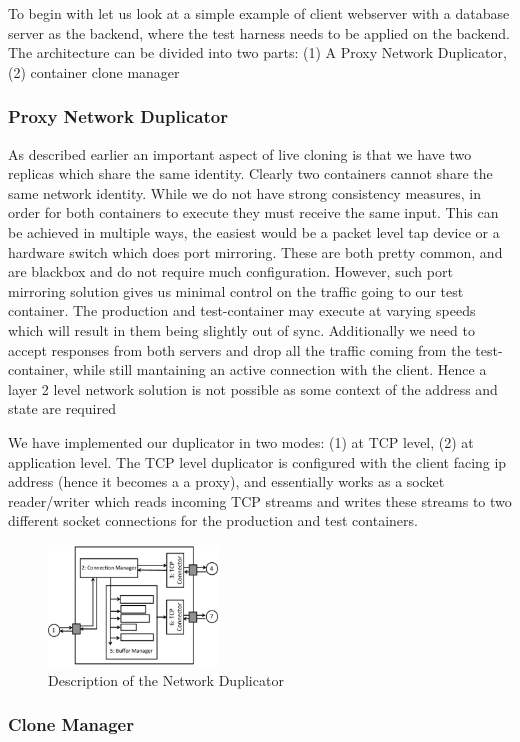 To begin with let us look at a simple example of client webserver with a database server as the backend, where the test harness needs to be applied on the backend.
The architecture can be divided into two parts: (1) A Proxy Network Duplicator, (2) container clone manager


\subsubsection{Proxy Network Duplicator} As described earlier an important aspect of live cloning is that we have two replicas which share the same identity.
Clearly two containers cannot share the same network identity. 
While we do not have strong consistency measures, in order for both containers to execute they must receive the same input.
This can be achieved in multiple ways, the easiest would be a packet level tap device or a hardware switch which does port mirroring. 
These are both pretty common, and are blackbox and do not require much configuration.
However, such port mirroring solution gives us minimal control on the traffic going to our test container.
The production and test-container may execute at varying speeds which will result in them being slightly out of sync.
Additionally we need to accept responses from both servers and drop all the traffic coming from the test-container, while still mantaining an active connection with the client.
Hence a layer 2 level network solution is not possible as some context of the address and state are required

We have implemented our duplicator in two modes: (1) at TCP level, (2) at application level.
The TCP level duplicator is configured with the client facing ip address (hence it becomes  a a proxy), and essentially works as a socket reader/writer which reads incoming TCP streams and writes these streams to two different socket connections for the production and test containers.

\begin{figure}[t]
  \begin{center}
    \includegraphics[width=0.4\textwidth]{figs/duplicator.eps}
    \caption{Description of the Network Duplicator}
    \label{fig:duplicator}
  \end{center}
\end{figure}


\subsubsection{Clone Manager} 

